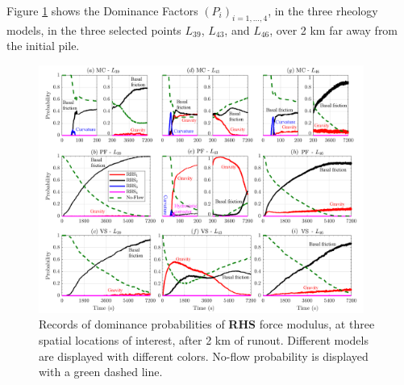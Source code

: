 \documentclass{article}
\begin{document}
Figure \ref{fig:Colima-Pr2} shows the Dominance Factors $(P_i)_{i=1,\dots,4}$, in the three rheology models, in the three selected points $L_{39}$, $L_{43}$, and $L_{46}$, over 2 km far away from the initial pile.
\begin{figure}[H]
         \centering
        \includegraphics[width=0.95\textwidth]{BAF_VolcanDeColima/ForceContrib/Pr2_total.png}
        \caption{Records of dominance probabilities of \textbf{RHS} force modulus, at three spatial locations of interest, after 2 km of runout. Different models are displayed with different colors. No-flow probability is displayed with a green dashed line.}
        \label{fig:Colima-Pr2}
\end{figure}
\end{document}
